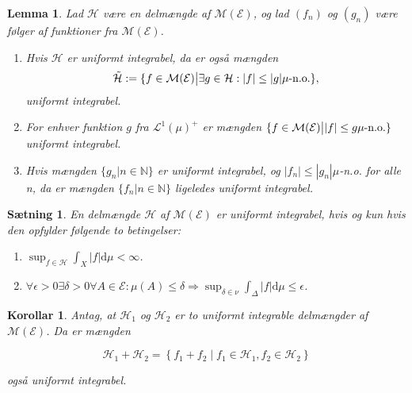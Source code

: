 \documentclass{article}
\newcommand{\N}{\mathbb{N}}
\newcommand{\1}{\mathbbm{1}}
\newcommand{\lclass}{\mathcal{L}}
\theoremstyle{boxed}
\newtheorem{lemma}[theorem]{Lemma}
\newtheorem{corollary}[theorem]{Korollar}
\newtheorem{proposition}[theorem]{Sætning}
\begin{document}
\begin{theorem-box}
    \begin{lemma}
        Lad $\mathcal{H}$ være en delmængde af $\mathcal{M}(\mathcal{E})$, og lad $(f_n)$ og $(g_n)$ være følger af funktioner fra $\mathcal{M}(\mathcal{E})$.
        \begin{enumerate}
            \item[\textnormal{(i)}] Hvis $\mathcal{H}$ er uniformt integrabel, da er også mængden 
            $$\tilde{\mathcal{H}}:=\{f\in\mathcal{M}(\mathcal{E})\big{|}\exists g\in\mathcal{H}:|f|\leq |g| \mu\text{-n.o.}\},$$
            uniformt integrabel.
            \item[\textnormal{(ii)}] For enhver funktion $g$ fra $\lclass^1(\mu)^+$ er mængden $\{f\in\mathcal{M}(\mathcal{E})\big{|}|f|\leq g \mu\text{-n.o.}\}$ uniformt integrabel.
            \item[\textnormal{(iii)}] Hvis mængden $\{g_n|n\in\N\}$ er uniformt integrabel, og $|f_n|\leq|g_n| \mu$-n.o. for alle n, da er mængden $\{f_n|n\in\N\}$ ligeledes uniformt integrabel.
        \end{enumerate}
    \end{lemma}
\end{theorem-box}
\begin{theorem-box}
    \begin{proposition}
        En delmængde $\mathcal{H}$ af $\mathcal{M}(\mathcal{E})$ er uniformt integrabel, hvis og kun hvis den opfylder følgende to betingelser:
        \begin{enumerate}
            \item[\textnormal{(i)}]$\sup _{f \in \mathcal{H}} \int_X|f| \mathrm{d} \mu<\infty$.
            \item[\textnormal{(ii)}] $\forall \epsilon>0 \exists \delta>0 \forall A \in \mathcal{E}: \mu(A) \leq \delta \Longrightarrow \sup _{\delta \in \nu} \int_{\Delta}|f| \mathrm{d} \mu \leq \epsilon$.
        \end{enumerate}
    \end{proposition}
\end{theorem-box}
\begin{theorem-box}
    \begin{corollary}
        Antag, at $\mathcal{H}_1$ og $\mathcal{H}_2$ er to uniformt integrable delmængder af $\mathcal{M}(\mathcal{E})$.
Da er mængden

$$
\mathcal{H}_1+\mathcal{H}_2=\left\{f_1+f_2 \mid f_1 \in \mathcal{H}_1, f_2 \in \mathcal{H}_2\right\}
$$

også uniformt integrabel.
    \end{corollary}
\end{theorem-box}
\end{document}
